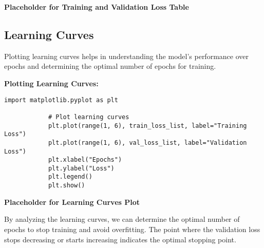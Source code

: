         \textbf{Placeholder for Training and Validation Loss Table}
            
    \subsection{Learning Curves}
    
        Plotting learning curves helps in understanding the model's performance over epochs and determining the optimal number of epochs for training.

        \textbf{Plotting Learning Curves:}
        
        \vspace{0.5em}

        \begin{lstlisting}[caption={Plot learning curves}, label={lst:plot_learning_curves}]
            import matplotlib.pyplot as plt

            # Plot learning curves
            plt.plot(range(1, 6), train_loss_list, label="Training Loss")
            plt.plot(range(1, 6), val_loss_list, label="Validation Loss")
            plt.xlabel("Epochs")
            plt.ylabel("Loss")
            plt.legend()
            plt.show()
        \end{lstlisting}

        \textbf{Placeholder for Learning Curves Plot}

        By analyzing the learning curves, we can determine the optimal number of epochs to stop training and avoid overfitting. The point where the validation loss stops decreasing or starts increasing indicates the optimal stopping point.
